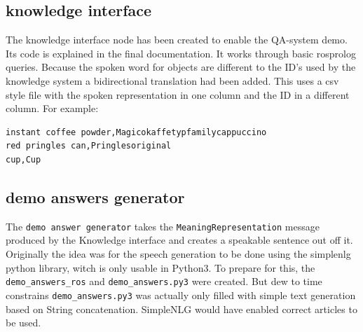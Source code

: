 \documentclass[main.tex]{subfiles}
\begin{document}
        \subsection{knowledge interface}
            The knowledge interface node has been created to enable the QA-system demo. Its code is explained in the final documentation. It works through basic rosprolog queries. Because the spoken word for objects are different to the ID's used by the knowledge system a bidirectional translation had been added. This uses a csv style file with the spoken representation in one column and the ID in a different column. For example:
            \begin{verbatim}
instant coffee powder,Magicokaffetypfamilycappuccino
red pringles can,Pringlesoriginal
cup,Cup

            \end{verbatim}
        \subsection{demo answers generator}
            The \texttt{demo answer generator} takes the \texttt{MeaningRepresentation} message produced by the Knowledge interface and creates a speakable sentence out off it. Originally the idea was for the speech generation to be done using the simplenlg python library, witch is only usable in Python3. To prepare for this, the \texttt{demo\_answers\_ros} and \texttt{demo\_answers.py3} were created. But dew to time constrains \texttt{demo\_answers.py3} was actually only filled with simple text generation based on String concatenation. SimpleNLG would have enabled correct articles to be used.
    
    	
\end{document}
